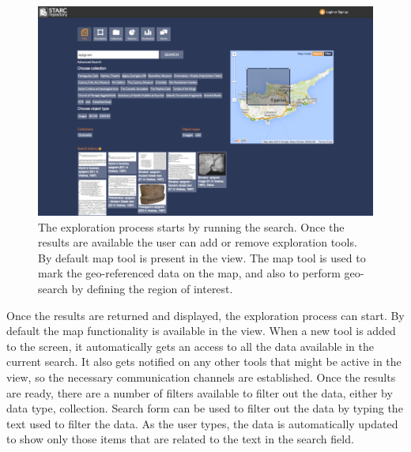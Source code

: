 \documentclass[amsthm,ebook]{saparticle}
\begin{document}
\begin{figure}[!hbp]
\centering
 \includegraphics[width=\columnwidth]{DamnjanovicetalEAGLE2016-img001.png}
\caption{The exploration process starts by running the search. Once the results are available the user can add or remove
exploration tools. By default map tool is present in the view. The map tool is used to mark the geo-referenced data on
the map, and also to perform geo-search by defining the region of interest. }
\label{fig:1}
\end{figure}


Once the results are returned and displayed, the exploration process can start. By default the map functionality is
available in the view. When a new tool is added to the screen, it automatically gets an access to all the data
available in the current search. It also gets notified on any other tools that might be active in the view, so the
necessary communication channels are established. Once the results are ready, there are a number of filters available to
filter out the data, either by data type, collection. Search form can be used to filter out the data by typing the text
used to filter the data. As the user types, the data is automatically updated to show only those items that are related
to the text in the search field. 
\end{document}
